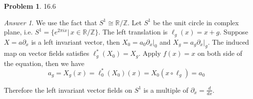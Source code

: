 \documentclass[10pt,a4paper]{article}
\theoremstyle{plain}
\theoremstyle{definition}
\newtheorem*{problem*}{Problem}
\theoremstyle{remark}
\newtheorem{answer}{Answer}
\newcommand{\IR}{\mathbb{R}}
\newcommand{\IZ}{\mathbb{Z}}
\newcommand{\<}{\langle}
\renewcommand{\>}{\rangle}
\newcommand{\p}{\partial}
\newcommand{\isom}{\cong}
\begin{document}
\begin{problem*} 16.6
\end{problem*}

\begin{answer}\hfill

We use the fact that $S^1 \isom \IR/\IZ$. Let $S^1$ be the unit circle in complex plane, i.e. $S^1 = \{e^{2\pi i x}|\,x \in \IR/\IZ\}$. The left translation is $\ell_g(x) = x+g$. Suppose $X = a\p_x$ is a left invariant vector, then $X_0 = a_0\p_x|_0$ and $X_g = a_g\p_x|_g$. The induced map on vector fields satisfies $\ell_g^*(X_0) = X_g$. Apply $f(x) = x$ on both side of the equation, then we have
\[a_g = X_g(x) = \ell_0^*(X_0)(x) = X_0(x\circ \ell_g) = a_0\]

Therefore the left invariant vector fields on $S^1$ is a multiple of $\p_x = \frac{d}{dx}$.\\
\end{answer}
\end{document}
